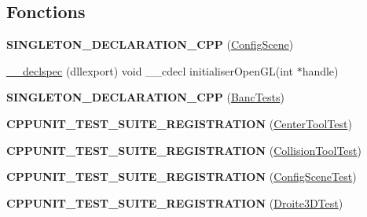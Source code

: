 \subsection*{Fonctions}
\begin{DoxyCompactItemize}
\item 
\hypertarget{group__inf2990_ga20fe9d4d1e6e509d0718eeb7e75a4e7e}{{\bfseries S\-I\-N\-G\-L\-E\-T\-O\-N\-\_\-\-D\-E\-C\-L\-A\-R\-A\-T\-I\-O\-N\-\_\-\-C\-P\-P} (\hyperlink{class_config_scene}{Config\-Scene})}\label{group__inf2990_ga20fe9d4d1e6e509d0718eeb7e75a4e7e}

\item 
\hyperlink{group__inf2990_gab7f5f39b522334aa53af43ba21a16719}{\-\_\-\-\_\-declspec} (dllexport) void \-\_\-\-\_\-cdecl initialiser\-Open\-G\-L(int $\ast$handle)
\item 
\hypertarget{group__inf2990_ga86f207a06d2ee0fe3776546d90b834aa}{{\bfseries S\-I\-N\-G\-L\-E\-T\-O\-N\-\_\-\-D\-E\-C\-L\-A\-R\-A\-T\-I\-O\-N\-\_\-\-C\-P\-P} (\hyperlink{class_banc_tests}{Banc\-Tests})}\label{group__inf2990_ga86f207a06d2ee0fe3776546d90b834aa}

\item 
\hypertarget{group__inf2990_ga37fbdbb4443b2edbcf26b49b91fbc7f2}{{\bfseries C\-P\-P\-U\-N\-I\-T\-\_\-\-T\-E\-S\-T\-\_\-\-S\-U\-I\-T\-E\-\_\-\-R\-E\-G\-I\-S\-T\-R\-A\-T\-I\-O\-N} (\hyperlink{class_center_tool_test}{Center\-Tool\-Test})}\label{group__inf2990_ga37fbdbb4443b2edbcf26b49b91fbc7f2}

\item 
\hypertarget{group__inf2990_ga89b2463d363b6fc531a4869b3ab974ad}{{\bfseries C\-P\-P\-U\-N\-I\-T\-\_\-\-T\-E\-S\-T\-\_\-\-S\-U\-I\-T\-E\-\_\-\-R\-E\-G\-I\-S\-T\-R\-A\-T\-I\-O\-N} (\hyperlink{class_collision_tool_test}{Collision\-Tool\-Test})}\label{group__inf2990_ga89b2463d363b6fc531a4869b3ab974ad}

\item 
\hypertarget{group__inf2990_gaba2288f4fc1f1092a717cfa6dff12f6b}{{\bfseries C\-P\-P\-U\-N\-I\-T\-\_\-\-T\-E\-S\-T\-\_\-\-S\-U\-I\-T\-E\-\_\-\-R\-E\-G\-I\-S\-T\-R\-A\-T\-I\-O\-N} (\hyperlink{class_config_scene_test}{Config\-Scene\-Test})}\label{group__inf2990_gaba2288f4fc1f1092a717cfa6dff12f6b}

\item 
\hypertarget{group__inf2990_ga194b622f6e88a42d7633a775e4717452}{{\bfseries C\-P\-P\-U\-N\-I\-T\-\_\-\-T\-E\-S\-T\-\_\-\-S\-U\-I\-T\-E\-\_\-\-R\-E\-G\-I\-S\-T\-R\-A\-T\-I\-O\-N} (\hyperlink{class_droite3_d_test}{Droite3\-D\-Test})}\label{group__inf2990_ga194b622f6e88a42d7633a775e4717452}


\end{DoxyCompactItemize}
